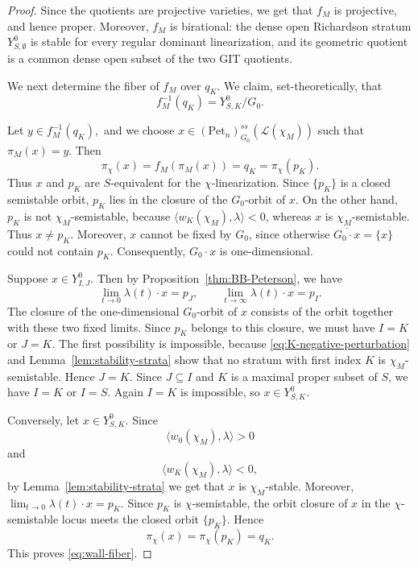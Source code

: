 \documentclass[12pt, reqno]{amsart}
\theoremstyle{plain}
\numberwithin{equation}{section}
\theoremstyle{definition}
\begin{document}
\begin{proof}
Since the quotients are projective varieties, we get that \(f_M\) is
projective, and hence proper. Moreover, \(f_M\) is birational:
the dense open Richardson stratum $Y^0_{S,\emptyset}$
is stable for every regular dominant linearization, and its geometric
quotient is a common dense open subset of the two GIT quotients.

We next determine the fiber of \(f_M\) over \(q_K\). We claim,
set-theoretically, that
\begin{equation}\label{eq:wall-fiber}
f_M^{-1}(q_K)
=
Y^0_{S,K}/G_0.
\end{equation}

Let $y\in f_M^{-1}(q_K),$
and we choose $x\in
(\mathrm{Pet}_n)^{ss}_{G_0}(\mathcal L(\chi_M))$ such that $\pi_M(x)=y.$
Then
\[
\pi_\chi(x)
=
f_M(\pi_M(x))
=
q_K
=
\pi_\chi(p_K).
\]
Thus \(x\) and \(p_K\) are \(S\)-equivalent for the
\(\chi\)-linearization. Since \(\{p_K\}\) is a closed semistable
orbit, \(p_K\) lies in the closure of the \(G_0\)-orbit of \(x\). On the other hand, \(p_K\) is not \(\chi_M\)-semistable, because
\(\langle w_K(\chi_M),\lambda\rangle<0\), whereas \(x\) is
\(\chi_M\)-semistable. Thus \(x\neq p_K\). Moreover, \(x\) cannot be
fixed by \(G_0\), since otherwise
\(\overline{G_0\cdot x}=\{x\}\) could not contain \(p_K\).
Consequently, \(G_0\cdot x\) is one-dimensional.

Suppose $x\in Y^0_{I,J}.$ Then by Proposition~\ref{thm:BB-Peterson}, we have 
\[
\lim_{t\to0}\lambda(t)\cdot x=p_J,
\qquad
\lim_{t\to\infty}\lambda(t)\cdot x=p_I.
\]
The closure of the one-dimensional \(G_0\)-orbit of \(x\) consists
of the orbit together with these two fixed limits. Since \(p_K\)
belongs to this closure, we must have $I=K$ or $J=K$.
The first possibility is impossible, because
\eqref{eq:K-negative-perturbation} and
Lemma~\ref{lem:stability-strata} show that no stratum with first
index \(K\) is \(\chi_M\)-semistable. Hence $J=K.$
Since \(J\subseteq I\) and \(K\) is a maximal proper subset of \(S\),
we have $I=K$ or $I=S$. Again \(I=K\) is impossible, so $x\in Y^0_{S,K}.$

Conversely, let $x\in Y^0_{S,K}.$ Since 
\[
\langle w_0(\chi_M),\lambda\rangle>0
\]
and
\[
\langle w_K(\chi_M),\lambda\rangle<0,
\]
by Lemma~\ref{lem:stability-strata} we get that \(x\) is
\(\chi_M\)-stable. Moreover, $\lim_{t\to0}\lambda(t)\cdot x=p_K.$
Since \(p_K\) is \(\chi\)-semistable, the orbit closure of \(x\) in
the \(\chi\)-semistable locus meets the closed orbit \(\{p_K\}\).
Hence
\[
\pi_\chi(x)=\pi_\chi(p_K)=q_K.
\]
This proves \eqref{eq:wall-fiber}.


\end{proof}
\end{document}
